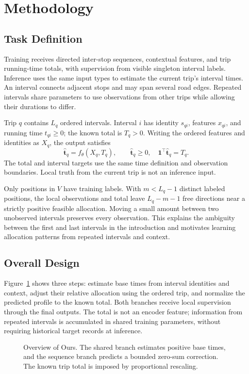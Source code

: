 \section{Methodology}
\subsection{Task Definition}
Training receives directed inter-stop sequences, contextual features, and trip running-time totals, with supervision from visible singleton interval labels. Inference uses the same input types to estimate the current trip's interval times. An interval connects adjacent stops and may span several road edges. Repeated intervals share parameters to use observations from other trips while allowing their durations to differ.

Trip $q$ contains $L_q$ ordered intervals. Interval $i$ has identity $s_{qi}$, features $x_{qi}$, and running time $t_{qi}\geq0$; the known total is $T_q>0$. Writing the ordered features and identities as $X_q$, the output satisfies
\begin{equation}
\hat{\boldsymbol t}_q=f_\theta(X_q,T_q),\qquad
\hat{\boldsymbol t}_q\geq0,\quad
\boldsymbol1^\top\hat{\boldsymbol t}_q=T_q.
\label{eq:task}
\end{equation}
The total and interval targets use the same time definition and observation boundaries. Local truth from the current trip is not an inference input.

Only positions in $V$ have training labels. With $m<L_q-1$ distinct labeled positions, the local observations and total leave $L_q-m-1$ free directions near a strictly positive feasible allocation. Moving a small amount between two unobserved intervals preserves every observation. This explains the ambiguity between the first and last intervals in the introduction and motivates learning allocation patterns from repeated intervals and context.

\subsection{Overall Design}
Figure~\ref{fig:framework} shows three steps: estimate base times from interval identities and context, adjust their relative allocation using the ordered trip, and normalize the predicted profile to the known total. Both branches receive local supervision through the final outputs. The total is not an encoder feature; information from repeated intervals is accumulated in shared training parameters, without requiring historical target records at inference.
\begin{figure}[t]
\centering
\rule{0pt}{1.5in}
\caption{Overview of Ours. The shared branch estimates positive base times, and the sequence branch predicts a bounded zero-sum correction. The known trip total is imposed by proportional rescaling.}\label{fig:framework}
\end{figure}
